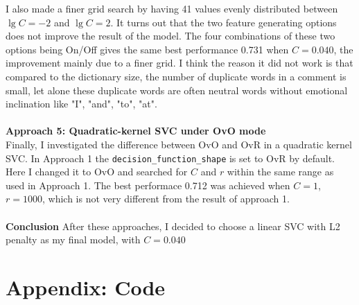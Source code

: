 \documentclass{article}
\begin{document}
I also made a finer grid search by having 41 values evenly distributed between
$\lg C=-2$ and $\lg C=2$.
It turns out that the two feature generating options does not improve the result of the model. The four combinations of these two options being On/Off
gives the same best performance 0.731 when $C=0.040$,
the improvement mainly due to a finer grid. I think the reason it did not work
is that compared to the dictionary size,
the number of duplicate words in a comment is small,
let alone these duplicate words are often neutral words without emotional inclination
like "I", "and", "to", "at". \\\\
\textbf{Approach 5: Quadratic-kernel SVC under OvO mode}\\
\indent Finally, I investigated the difference between OvO and OvR in a quadratic kernel SVC.
In Approach 1 the \texttt{decision\_function\_shape} is set to OvR by default.
Here I changed it to OvO and searched for $C$ and $r$ within the same range as used in Approach 1.
The best performace 0.712 was achieved when $C=1$, $r=1000$,
which is not very different from the result of approach 1.\\\\
\textbf{Conclusion} After these approaches, I decided to choose a linear SVC with L2 penalty as my final model, with $C=0.040$

\newpage
\section*{Appendix: Code}
\end{document}
